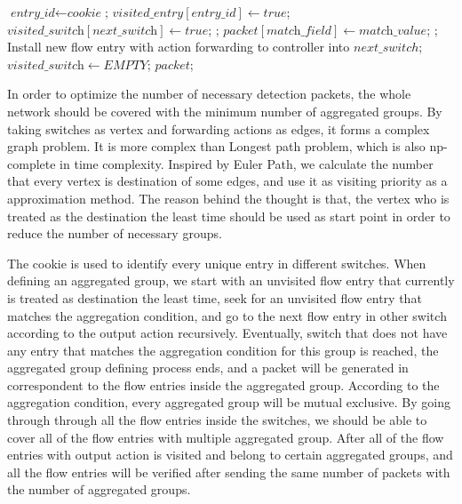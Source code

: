 \begin {tcolorbox}[blanker,float=tbp,
grow to left by=1cm, grow to right by=1cm]
\begin{algorithm}[H]
  \begin{algorithmic}[1]
        \State $\textit{entry\_id} \gets \textit{cookie}$;
          \State $\textit{visited\_entry}[\textit{entry\_id}] \gets true$;
          \State $\textit{visited\_switch}[\textit{next\_switch}] \gets true$;
            \State \Return {};
            \State $\textit{packet}[\textit{match\_field}] \gets \textit{match\_value}$;
            \State \Return {};
          \EndIf
        \EndIf
      \EndFor
      \State Install new flow entry with action forwarding to controller into $next\_switch$;
      \State $\textit{visited\_switch} \gets EMPTY$;
      \State \Return $packet$;
    \EndFunction
  \end{algorithmic}
\end{algorithm}
\end{tcolorbox}

In order to optimize the number of necessary detection packets, the whole network should be covered with the minimum number of aggregated groups. By taking switches as vertex and forwarding actions as edges, it forms a complex graph problem. It is more complex than Longest path problem, which is also np-complete in time complexity. Inspired by Euler Path, we calculate the number that every vertex is destination of some edges, and use it as visiting priority as a approximation method. The reason behind the thought is that, the vertex who is treated as the destination the least time should be used as start point in order to reduce the number of necessary groups.

The cookie is used to identify every unique entry in different switches. When defining an aggregated group, we start with an unvisited flow entry that currently is treated as destination the least time, seek for an unvisited flow entry that matches the aggregation condition, and go to the next flow entry in other switch according to the output action recursively. Eventually, switch that does not have any entry that matches the aggregation condition for this group is reached, the aggregated group defining process ends, and a packet will be generated in correspondent to the flow entries inside the aggregated group. According to the aggregation condition, every aggregated group will be mutual exclusive. By going through through all the flow entries inside the switches, we should be able to cover all of the flow entries with multiple aggregated group. After all of the flow entries with output action is visited and belong to certain aggregated groups, and all the flow entries will be verified after sending the same number of packets with the number of aggregated groups. 

